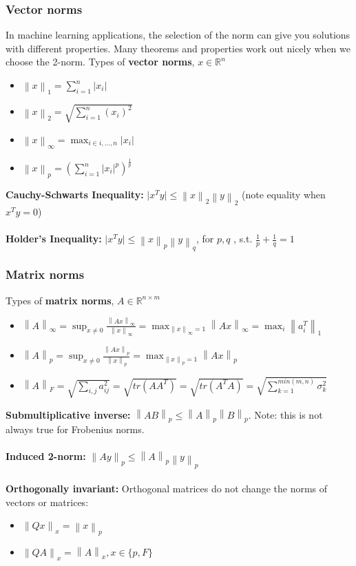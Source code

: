 \documentclass{article}
\newcommand{\norm}[2]{\left\lVert#1\right\rVert_#2}
\newcommand{\abs}[1]{\lvert#1\rvert}
\begin{document}
\subsubsection{Vector norms}
In machine learning applications, the selection of the norm can give you solutions with different properties. Many theorems and properties work out nicely when we choose the 2-norm.
\noindent Types of \textbf{vector norms}, $x \in \mathbb{R}^{n}$
\begin{itemize}
    \item $\norm{x}{1} = \sum_{i=1}^n \abs{x_i}$
    \item $\norm{x}{2} = \sqrt{\sum_{i=1}^n (x_i)^2}$
    \item $\norm{x}{\infty} = \max_{i \in i,\dots, n} \abs{x_i}$
    \item $\norm{x}{p} = (\sum_{i=1}^n \abs{x_i}^p)^{\frac{1}{p}}$
\end{itemize}
\textbf{Cauchy-Schwarts Inequality:} $\abs{x^Ty}\leq \norm{x}{2}\norm{y}{2}$ (note equality when $x^Ty = 0$)\\ \\
\textbf{Holder's Inequality:} $\abs{x^Ty} \leq \norm{x}{p}\norm{y}{q}$, for $p, q$ , s.t. $\frac{1}{p} + \frac{1}{q} = 1$

\subsubsection{Matrix norms}
\noindent Types of \textbf{matrix norms}, $A \in \mathbb{R}^{n \times m}$
\begin{itemize}
    \item $\norm{A}{\infty} = \sup_{x\neq 0}\frac{\norm{Ax}{\infty}}{\norm{x}{\infty}} = \max_{\norm{x}{\infty}=1}\norm{Ax}{\infty} = \max_i\norm{a_i^T}{1}$
    \item $\norm{A}{p} = \sup_{x\neq 0}\frac{\norm{Ax}{p}}{\norm{x}{p}} = \max_{\norm{x}{p}=1}\norm{Ax}{p}$
    \item $\norm{A}{F} = \sqrt{\sum_{i,j} a_{ij}^2} = \sqrt{tr(AA^T)} = \sqrt{tr(A^TA)} = \sqrt{\sum_{k=1}^{min(m,n)}\sigma_k^2} $
\end{itemize}
\textbf{Submultiplicative inverse:} $\norm{AB}{p} \leq \norm{A}{p}\norm{B}{p}$. Note: this is not always true for Frobenius norms.\\ \\
\textbf{Induced 2-norm: } $\norm{Ay}{p} \leq \norm{A}{p}\norm{y}{p}$\\ \\
\textbf{Orthogonally invariant:} Orthogonal matrices do not change the norms of vectors or matrices:
\begin{itemize}
    \item $\norm{Qx}{x} = \norm{x}{p}$
    \item $\norm{QA}{x} = \norm{A}{x}, x \in \{p, F\}$
\end{itemize}
\end{document}
